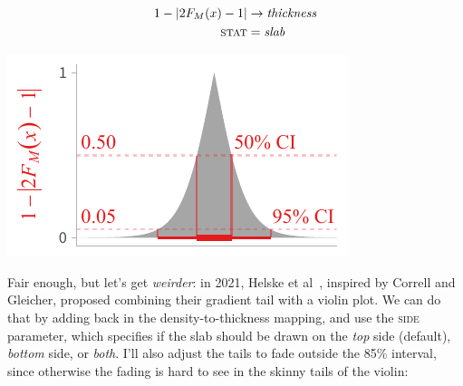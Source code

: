 \documentclass[journal]{vgtc}                     %
\begin{document}
\noindent
\begin{minipage}{.5\columnwidth}

\begin{align*}
1 - \lvert 2 F_M(x) - 1 \rvert &\rightarrow \textit{thickness}\\
\textsc{stat} &= \mathit{slab}
\end{align*}
\end{minipage}%
  \begin{minipage}{.4\columnwidth}
    \centering
    \includegraphics[width=1.2\columnwidth]{figs/3-slab_consonance.pdf}
  \end{minipage}
\hfill\break

Fair enough, but let's get \textit{weirder}: in 2021, Helske et al~\cite{helske2021can}, inspired by Correll and Gleicher, proposed combining their gradient tail with a violin plot. We can do that by adding back in the density-to-thickness mapping, and use the \textsc{side} parameter, which specifies if the slab should be drawn on the \textit{top} side (default), \textit{bottom} side, or \textit{both}. I'll also adjust the tails to fade outside the 85\% interval, since otherwise the fading is hard to see in the skinny tails of the violin:
\end{document}
